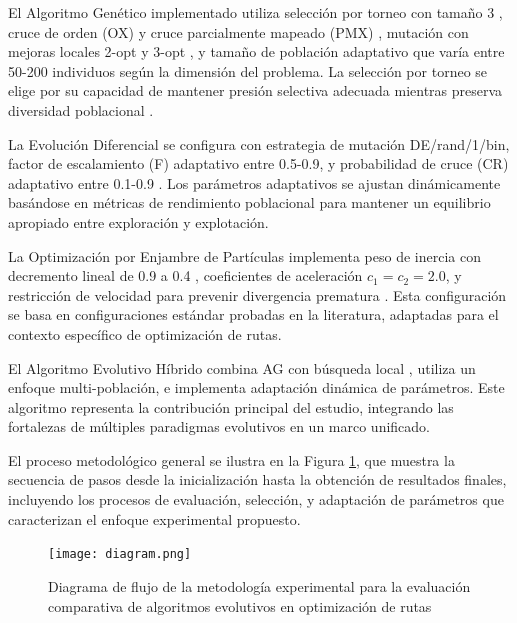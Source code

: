\documentclass[10pt,a4paper]{article}
\begin{document}
\begin{multicols}{2}
El Algoritmo Genético implementado utiliza selección por torneo con tamaño 3 \cite{blickle1996}, cruce de orden (OX) y cruce parcialmente mapeado (PMX) \cite{syswerda1989}, mutación con mejoras locales 2-opt y 3-opt \cite{reynolds2007}, y tamaño de población adaptativo que varía entre 50-200 individuos según la dimensión del problema. La selección por torneo se elige por su capacidad de mantener presión selectiva adecuada mientras preserva diversidad poblacional \cite{eiben2003}.

La Evolución Diferencial se configura con estrategia de mutación DE/rand/1/bin, factor de escalamiento (F) adaptativo entre 0.5-0.9, y probabilidad de cruce (CR) adaptativo entre 0.1-0.9 \cite{das2011}. Los parámetros adaptativos se ajustan dinámicamente basándose en métricas de rendimiento poblacional para mantener un equilibrio apropiado entre exploración y explotación.

La Optimización por Enjambre de Partículas implementa peso de inercia con decremento lineal de 0.9 a 0.4 \cite{clerc2002}, coeficientes de aceleración $c_1=c_2=2.0$, y restricción de velocidad para prevenir divergencia prematura \cite{pedersen2010}. Esta configuración se basa en configuraciones estándar probadas en la literatura, adaptadas para el contexto específico de optimización de rutas.

El Algoritmo Evolutivo Híbrido combina AG con búsqueda local \cite{voudouris2003}, utiliza un enfoque multi-población, e implementa adaptación dinámica de parámetros. Este algoritmo representa la contribución principal del estudio, integrando las fortalezas de múltiples paradigmas evolutivos en un marco unificado.

El proceso metodológico general se ilustra en la Figura \ref{fig:methodology_flowchart}, que muestra la secuencia de pasos desde la inicialización hasta la obtención de resultados finales, incluyendo los procesos de evaluación, selección, y adaptación de parámetros que caracterizan el enfoque experimental propuesto.
\end{multicols}

\begin{figure}[htbp]

\centering
\texttt{[image: diagram.png]}
\caption{Diagrama de flujo de la metodología experimental para la evaluación comparativa de algoritmos evolutivos en optimización de rutas}
\label{fig:methodology_flowchart}
\end{figure}
\end{document}
